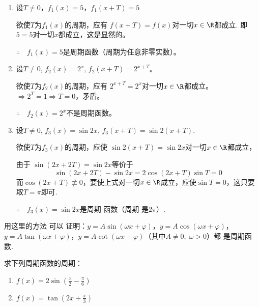 \begin{solution}
\begin{enumerate}[(1)]
    \item 设$T\ne 0$，$f_1(x)=5$，$f_1(x+T)=5$
    
    欲使$T$为$f_1(x)$的周期，应有
    $f(x+T)=f(x)$对一切$x\in\R$都成立. 即$5=5$对一切$x$都成立，这是显然的。
    
    $\therefore\quad f_1(x)=5$是周期函数（周期为任意非零实数）。
    \item 设$T\ne 0$, $f_2(x)=2^x$, $f_2(x+T)=2^{x+T}$。
    
    欲使$T$为$f_2(x)$的周期，应有
    $2^{x+T}=2^x$对一切$x\in \R$都成立。$\Rightarrow 2^T=1\Rightarrow T=0$，矛盾。
    
    $\therefore\quad f_2(x)=2^x$不是周期函数。
    \item 设$T\ne 0$, $f_3(x)=\sin2x$, 
    $f_3(x+T)=\sin2(x+T)$.

    欲使$T$为$f_3(x)$的周期，应使
    $\sin2(x+T)=\sin2x$对一切$x\in\R$都成立，

    由于
    $\sin(2x+2T)=\sin2x$等价于
    $$\sin(2x+2T)-\sin2x=2\cos(2x+T)\sin T=0$$
而$\cos(2x+T)\not\equiv 0$，要使上式对一切$x\in\R$成立，应使$\sin T=0$，这只要取$T=\pi$即可.

$\therefore\quad f_3(x)=\sin 2x$是周期 函数（周期 是$2\pi$）.
\end{enumerate}
\end{solution}

\begin{note}
用这里的方法 可以 证明：$y=A\sin (\omega x+\varphi)$，$y=A\cos (\omega x+\varphi)$，$y=A\tan (\omega x+\varphi)$，$y=A\cot (\omega x+\varphi)$（其中$A\ne 0,\; \omega>0$）都 是周期函数.
\end{note}

\begin{example}
求下列周期函数的周期：
\begin{multicols}{2}
\begin{enumerate}[(1)]
    \item $f(x)=2\sin\left(\frac{x}{2}-\frac{\pi}{6}\right)$
    \item $f(x)=\tan\left(2x+\frac{\pi}{3}\right)$
\end{enumerate}
\end{multicols}    
\end{example}

